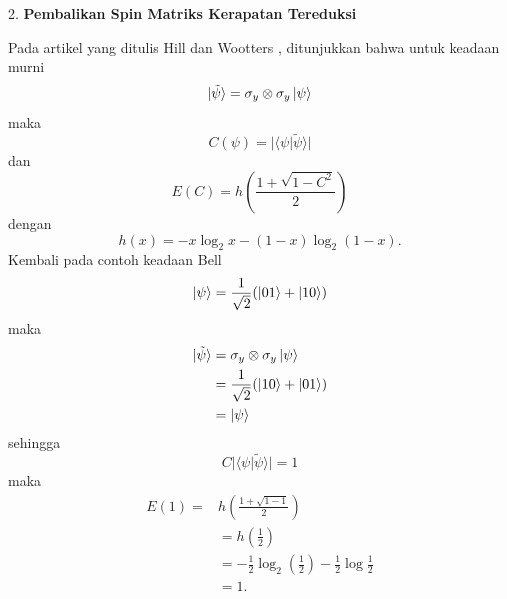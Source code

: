 2. \textbf{Pembalikan Spin Matriks Kerapatan Tereduksi}
\par
Pada artikel yang ditulis Hill dan Wootters \cite{Hill1997}, ditunjukkan bahwa untuk keadaan murni
\begin{equation}
	\ket{\tilde{\psi}}=\sigma_y\otimes\sigma_y\ket{\psi}
\end{equation}
maka
\begin{equation}
	C(\psi)=|\langle\psi|\tilde{\psi}\rangle|
\end{equation}
dan
\begin{equation}
	E(C)=h(\frac{1+\sqrt{1-C^2}}{2})
\end{equation}
dengan
\begin{equation}
	h(x)=-x\log_2 x-(1-x)\log_2(1-x).
\end{equation}
Kembali pada contoh keadaan Bell
\begin{equation*}
	\ket{\psi}=\frac{1}{\sqrt{2}}(\ket{01}+\ket{10})
\end{equation*}
maka
\begin{equation}
	\begin{aligned}
		\ket{\tilde{\psi}}
		&=\sigma_y\otimes\sigma_y\ket{\psi}\\
		&=\frac{1}{\sqrt{2}}(\ket{10}+\ket{01})\\
		&=\ket{\psi}
	\end{aligned}
\end{equation}
sehingga
\begin{equation}
	C|\langle\psi|\tilde{\psi}\rangle|=1
\end{equation}
maka
\begin{equation}
	\begin{aligned}
		E(1)=
		&h(\frac{1+\sqrt{1-1}}{2})\\
		&=h(\frac{1}{2})\\
		&=-\frac{1}{2}\log_2(\frac{1}{2})-\frac{1}{2}\log\frac{1}{2}\\
		&=1.
	\end{aligned}
\end{equation}
	
